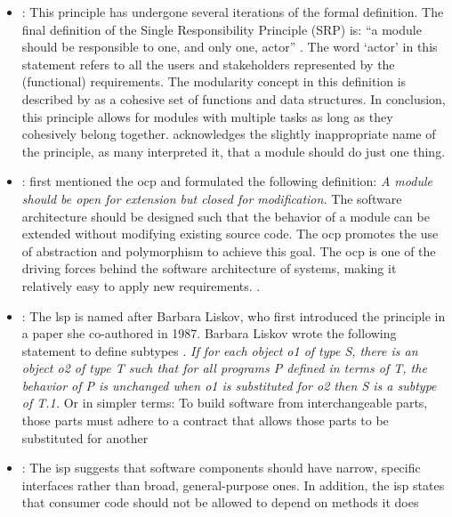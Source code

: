 \begin{itemize}
    \item {}: This principle has undergone several iterations of the formal
    definition. The final definition of the Single Responsibility Principle (SRP) is:
    \enquote{a module should be responsible to one, and only one, actor}
    \parencite[82]{r_c_martin_clean_2018}. The word \enquote*{actor} in this statement refers to all
    the users and stakeholders represented by the (functional) requirements. The
    modularity concept in this definition is described by
    \textcite[82]{r_c_martin_clean_2018} as a cohesive set of functions and data
    structures. In conclusion, this principle allows for modules with multiple tasks as
    long as they cohesively belong together. \textcite[81]{r_c_martin_clean_2018}
    acknowledges the slightly inappropriate name of the principle, as many interpreted it,
    that a module should do just one thing.
    \item {}: \textcite{meyer_object-oriented_1988} first mentioned the
    \gls{ocp} and formulated the following definition: \textit{A module should be open for
    extension but closed for modification.} The software architecture should be designed
    such that the behavior of a module can be extended without modifying existing source
    code. The \gls{ocp} promotes the use of abstraction and polymorphism to achieve this
    goal. The \gls{ocp} is one of the driving forces behind the software architecture of
    systems, making it relatively easy to apply new requirements.
    \parencite[94]{r_c_martin_clean_2018}.
    \item {}: The \gls{lsp} is named after Barbara Liskov, who first introduced
    the principle in a paper she co-authored in 1987. Barbara Liskov wrote the following
    statement to define subtypes \parencite[92]{r_c_martin_clean_2018}. \textit{If for each
    object o1 of type S, there is an object o2 of type T such that for all programs P
    defined in terms of T, the behavior of P is unchanged when o1 is substituted for o2
    then S is a subtype of T.1.} Or in simpler terms: To build software from
    interchangeable parts, those parts must adhere to a contract that allows those parts
    to be substituted for another \parencite[80]{r_c_martin_clean_2018}
    \item {}: The \gls{isp} suggests that software components should have
    narrow, specific interfaces rather than broad, general-purpose ones. In addition, the
    \gls{isp} states that consumer code should not be allowed to depend on methods it does

\end{itemize}
